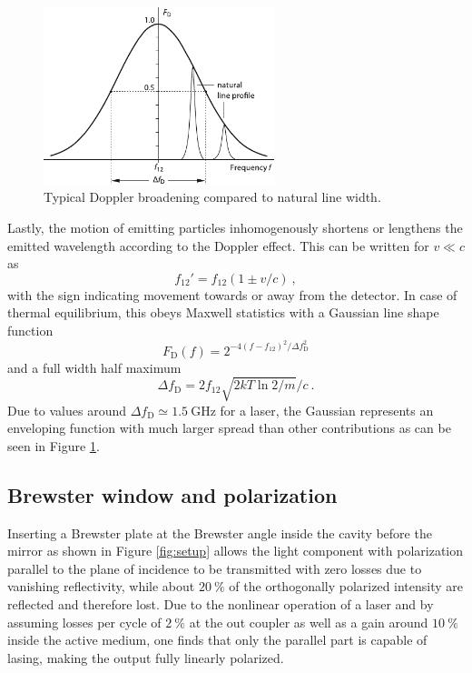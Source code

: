 \begin{figure}[H]
	\centering
	\includegraphics[width=0.60\textwidth]{content/graphics/broadening.pdf}
	\caption{Typical Doppler broadening compared to natural line width. \cite{Eichler_2018}}
	\label{fig:broadening}
\end{figure}

Lastly, the motion of emitting particles inhomogenously shortens or lengthens the emitted wavelength according to the Doppler effect.
This can be written for $v \ll c$ as
\begin{equation*}
	f_{12}' = f_{12} (1 \pm v / c) \: ,
\end{equation*}
with the sign indicating movement towards or away from the detector. In case of thermal equilibrium, this obeys Maxwell statistics with
a Gaussian line shape function
\begin{equation*}
	F_\text{D} (f) = 2^{- 4 (f - f_{12})^2 / \Delta f_\text{D}^2}
\end{equation*}
and a full width half maximum
\begin{equation*}
	\Delta f_\text{D} = 2 f_{12} \sqrt{2kT \ln 2 / m} / c \: .
\end{equation*}
Due to values around $\Delta f_\text{D} \simeq \qty{1.5}{\giga\hertz}$ for a \HeNe laser, the Gaussian represents an enveloping function
with much larger spread than other contributions as can be seen in Figure \ref{fig:broadening}.



\subsection{Brewster window and polarization}

Inserting a Brewster plate at the Brewster angle inside the cavity before the mirror as shown in Figure \ref{fig:setup} allows the light
component with polarization parallel to the plane of incidence to be transmitted with zero losses due to vanishing reflectivity, while
about $\qty{20}{\percent}$ of the orthogonally polarized intensity are reflected and therefore lost. Due to the nonlinear operation of
a laser and by assuming losses per cycle of $\qty{2}{\percent}$ at the out coupler as well as a gain around $\qty{10}{\percent}$ inside
the active medium, one finds that only the parallel part is capable of lasing, making the output fully linearly polarized.

